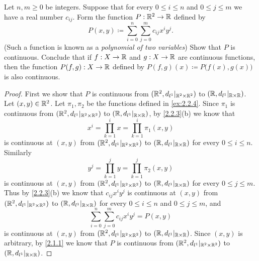 \begin{ex}\label{ex:2.2.5}
  Let \(n, m \geq 0\) be integers.
  Suppose that for every \(0 \leq i \leq n\) and \(0 \leq j \leq m\) we have a real number \(c_{ij}\).
  Form the function \(P : \mathbb{R}^2 \to \mathbb{R}\) defined by
  \[
    P(x, y) \coloneqq \sum_{i = 0}^n \sum_{j = 0}^m c_{ij} x^i y^j.
  \]
  (Such a function is known as a \emph{polynomial of two variables})
  Show that \(P\) is continuous.
  Conclude that if \(f : X \to \mathbb{R}\) and \(g : X \to \mathbb{R}\) are continuous functions, then the function \(P(f, g) : X \to \mathbb{R}\) defined by \(P(f, g)(x) \coloneqq P\big(f(x), g(x)\big)\) is also continuous.
\end{ex}

\begin{proof}
  First we show that \(P\) is continuous from \((\mathbb{R}^2, d_{l^1}|_{\mathbb{R}^2 \times \mathbb{R}^2})\) to \((\mathbb{R}, d_{l^1}|_{\mathbb{R} \times \mathbb{R}})\).
  Let \((x, y) \in \mathbb{R}^2\).
  Let \(\pi_1, \pi_2\) be the functions defined in \cref{ex:2.2.4}.
  Since \(\pi_1\) is continuous from \((\mathbb{R}^2, d_{l^1}|_{\mathbb{R}^2 \times \mathbb{R}^2})\) to \((\mathbb{R}, d_{l^1}|_{\mathbb{R} \times \mathbb{R}})\), by \cref{2.2.3}(b) we know that
  \[
    x^i = \prod_{k = 1}^i x = \prod_{k = 1}^i \pi_1(x, y)
  \]
  is continuous at \((x, y)\) from \((\mathbb{R}^2, d_{l^1}|_{\mathbb{R}^2 \times \mathbb{R}^2})\) to \((\mathbb{R}, d_{l^1}|_{\mathbb{R} \times \mathbb{R}})\) for every \(0 \leq i \leq n\).
  Similarly
  \[
    y^j = \prod_{k = 1}^j y = \prod_{k = 1}^j \pi_2(x, y)
  \]
  is continuous at \((x, y)\) from \((\mathbb{R}^2, d_{l^1}|_{\mathbb{R}^2 \times \mathbb{R}^2})\) to \((\mathbb{R}, d_{l^1}|_{\mathbb{R} \times \mathbb{R}})\) for every \(0 \leq j \leq m\).
  Thus by \cref{2.2.3}(b) we know that \(c_{ij} x^i y^j\) is continuous at \((x, y)\) from \((\mathbb{R}^2, d_{l^1}|_{\mathbb{R}^2 \times \mathbb{R}^2})\) to \((\mathbb{R}, d_{l^1}|_{\mathbb{R} \times \mathbb{R}})\) for every \(0 \leq i \leq n\) and \(0 \leq j \leq m\), and
  \[
    \sum_{i = 0}^n \sum_{j = 0}^m c_{ij} x^i y^j = P(x, y)
  \]
  is continuous at \((x, y)\) from \((\mathbb{R}^2, d_{l^1}|_{\mathbb{R}^2 \times \mathbb{R}^2})\) to \((\mathbb{R}, d_{l^1}|_{\mathbb{R} \times \mathbb{R}})\).
  Since \((x, y)\) is arbitrary, by \cref{2.1.1} we know that \(P\) is continuous from \((\mathbb{R}^2, d_{l^1}|_{\mathbb{R}^2 \times \mathbb{R}^2})\) to \((\mathbb{R}, d_{l^1}|_{\mathbb{R} \times \mathbb{R}})\).


\end{proof}
